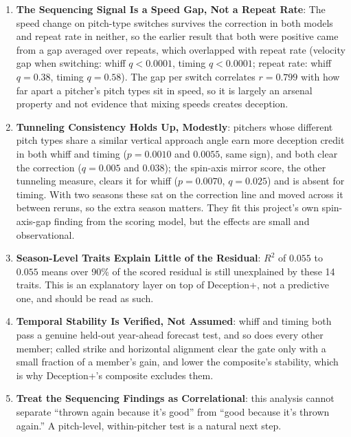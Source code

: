 \documentclass[11pt]{article}
\begin{document}
\begin{enumerate}
\item \textbf{The Sequencing Signal Is a Speed Gap, Not a Repeat Rate}: The speed change on pitch-type switches survives the correction in both models and repeat rate in neither, so the earlier result that both were positive came from a gap averaged over repeats, which overlapped with repeat rate (velocity gap when switching: whiff $q<0.0001$, timing $q<0.0001$; repeat rate: whiff $q=0.38$, timing $q=0.58$). The gap per switch correlates $r=0.799$ with how far apart a pitcher's pitch types sit in speed, so it is largely an arsenal property and not evidence that mixing speeds creates deception.
\item \textbf{Tunneling Consistency Holds Up, Modestly}: pitchers whose different pitch types share a similar vertical approach angle earn more deception credit in both whiff and timing ($p=0.0010$ and $0.0055$, same sign), and both clear the correction ($q=0.005$ and $0.038$); the spin-axis mirror score, the other tunneling measure, clears it for whiff ($p=0.0070$, $q=0.025$) and is absent for timing. With two seasons these sat on the correction line and moved across it between reruns, so the extra season matters. They fit this project's own spin-axis-gap finding from the scoring model, but the effects are small and observational.
\item \textbf{Season-Level Traits Explain Little of the Residual}: $R^2$ of $0.055$ to $0.055$ means over 90\% of the scored residual is still unexplained by these 14 traits. This is an explanatory layer on top of Deception+, not a predictive one, and should be read as such.
\item \textbf{Temporal Stability Is Verified, Not Assumed}: whiff and timing both pass a genuine held-out year-ahead forecast test, and so does every other member; called strike and horizontal alignment clear the gate only with a small fraction of a member's gain, and lower the composite's stability, which is why Deception+'s composite excludes them.
\item \textbf{Treat the Sequencing Findings as Correlational}: this analysis cannot separate ``thrown again because it's good'' from ``good because it's thrown again.'' A pitch-level, within-pitcher test is a natural next step.
\end{enumerate}
\end{document}
